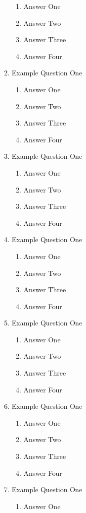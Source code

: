 \documentclass[11pt,fleqn]{article}
\begin{document}
\begin{enumerate}
	\begin{enumerate}
	\item Answer One
	\item Answer Two
	\item Answer Three
	\item Answer Four
	\end{enumerate}
\item Example Question One
	\begin{enumerate}
	\item Answer One
	\item Answer Two
	\item Answer Three
	\item Answer Four
	\end{enumerate}
\item Example Question One
	\begin{enumerate}
	\item Answer One
	\item Answer Two
	\item Answer Three
	\item Answer Four
	\end{enumerate}
\item Example Question One
	\begin{enumerate}
	\item Answer One
	\item Answer Two
	\item Answer Three
	\item Answer Four
	\end{enumerate}
\item Example Question One
	\begin{enumerate}
	\item Answer One
	\item Answer Two
	\item Answer Three
	\item Answer Four
	\end{enumerate}
\item Example Question One
	\begin{enumerate}
	\item Answer One
	\item Answer Two
	\item Answer Three
	\item Answer Four
	\end{enumerate}
\item Example Question One
	\begin{enumerate}
	\item Answer One

\end{enumerate}
\end{enumerate}
\end{document}
